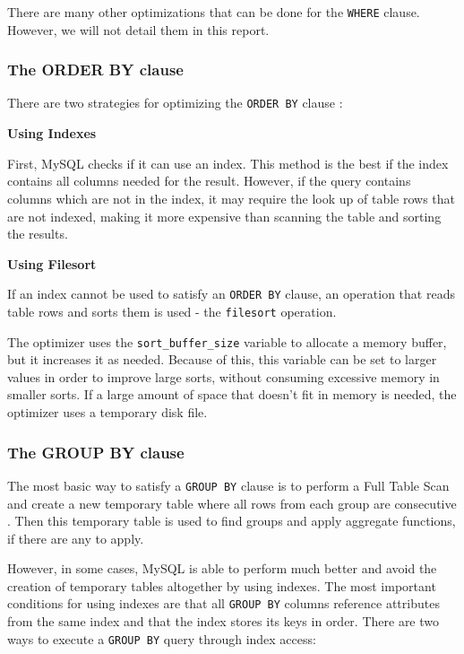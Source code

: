 \documentclass[12pt]{article}
\begin{document}
There are many other optimizations that can be done for the \verb|WHERE| clause. However, we will not detail them in this report.


\subsubsection{The ORDER BY clause}
\label{orderByClause}
There are two strategies for optimizing the \verb|ORDER BY| clause \parencite{ORDERBYClauseOptimization}:

\vspace{0.3cm}

\noindent \textbf{Using Indexes} 

First, MySQL checks if it can use an index. This method is the best if the index contains all columns needed for the result. However, if the query contains columns which are not in the index, it may require the look up of table rows that are not indexed, making it more expensive than scanning the table and sorting the results.

\vspace{0.3cm}

\noindent \textbf{Using Filesort} 

If an index cannot be used to satisfy an \verb|ORDER BY| clause, an operation that reads table rows and sorts them is used - the \verb|filesort| operation.

The optimizer uses the \verb|sort_buffer_size| variable to allocate a memory buffer, but it increases it as needed. Because of this, this variable can be set to larger values in order to improve large sorts, without consuming excessive memory in smaller sorts. If a large amount of space that doesn't fit in memory is needed, the optimizer uses a temporary disk file.


\subsubsection{The GROUP BY clause}
\label{groupByClause}
The most basic way to satisfy a \verb|GROUP BY| clause is to perform a Full Table Scan and create a new temporary table where all rows from each group are consecutive \parencite{GROUPBYClauseOptimization}. Then this temporary table is used to find groups and apply aggregate functions, if there are any to apply.

However, in some cases, MySQL is able to perform much better and avoid the creation of temporary tables altogether by using indexes. The most important conditions for using indexes are that all \verb|GROUP BY| columns reference attributes from the same index and that the index stores its keys in order. There are two ways to execute a \verb|GROUP BY| query through index access:
\vspace{0.3cm}
\end{document}
